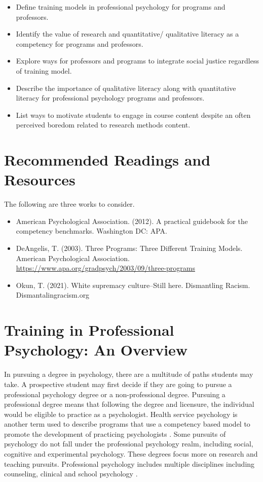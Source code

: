 \documentclass[
  11pt,
]{book}
\providecommand{\tightlist}{%
  \setlength{\itemsep}{0pt}\setlength{\parskip}{0pt}}
\begin{document}
\begin{itemize}
\tightlist
\item
  Define training models in professional psychology for programs and professors.
\item
  Identify the value of research and quantitative/ qualitative literacy as a competency for programs and professors.
\item
  Explore ways for professors and programs to integrate social justice regardless of training model.
\item
  Describe the importance of qualitative literacy along with quantitative literacy for professional psychology programs and professors.
\item
  List ways to motivate students to engage in course content despite an often perceived boredom related to research methods content.
\end{itemize}

\section{Recommended Readings and Resources}\label{recommended-readings-and-resources}

The following are three works to consider.

\begin{itemize}
\tightlist
\item
  American Psychological Association. (2012). A practical guidebook for the competency benchmarks. Washington DC: APA.
\item
  DeAngelis, T. (2003). Three Programs: Three Different Training Models. American Psychological Association. \url{https://www.apa.org/gradpsych/2003/09/three-programs}
\item
  Okun, T. (2021). White supremacy culture--Still here. Dismantling Racism. Dismantalingracism.org
\end{itemize}

\section{Training in Professional Psychology: An Overview}\label{training-in-professional-psychology-an-overview}

In pursuing a degree in psychology, there are a multitude of paths students may take. A prospective student may first decide if they are going to pursue a professional psychology degree or a non-professional degree. Pursuing a professional degree means that following the degree and licensure, the individual would be eligible to practice as a psychologist. Health service psychology is another term used to describe programs that use a competency based model to promote the development of practicing psychologists \citep{noauthor_what_nodate}. Some pursuits of psychology do not fall under the professional psychology realm, including social, cognitive and experimental psychology. These degrees focus more on research and teaching pursuits. Professional psychology includes multiple disciplines including counseling, clinical and school psychology \citep{noauthor_types_nodate}.
\end{document}
